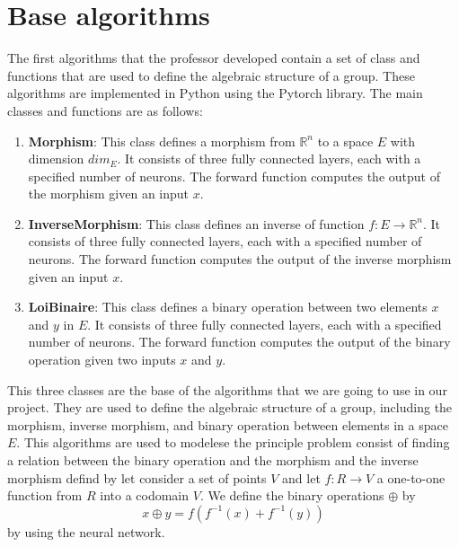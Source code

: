 \documentclass{report}
\begin{document}
        \section{Base algorithms}
        The first algorithms that the professor developed contain 
        a set of class and functions that are used to define the
        algebraic structure of a group. These algorithms are
        implemented in Python using the Pytorch library. The
        main classes and functions are as follows:

        \begin{enumerate}
            \item \textbf{Morphism}: This class defines a morphism from 
            $\mathbb{R}^n$ to a space $E$ with dimension $dim_E$. 
            It consists of three fully connected layers, each with 
            a specified number of neurons. The forward function computes 
            the output of the morphism given an input $x$.
            \item \textbf{InverseMorphism}: This class defines an inverse
            of function $f: E \rightarrow \mathbb{R}^n$. It consists of
            three fully connected layers, each with a specified number
            of neurons. The forward function computes the output of the
            inverse morphism given an input $x$.
            \item \textbf{LoiBinaire}: This class defines a binary operation 
            between two elements $x$ and $y$ in $E$. It consists of three 
            fully connected layers, each with a specified number of neurons. 
            The forward function computes the output of the binary operation 
            given two inputs $x$ and $y$.

        \end{enumerate}
        This three classes are the base of the algorithms that 
        we are going to use in our project. They are used to 
        define the algebraic structure of a group, including
        the morphism, inverse morphism, and binary operation
        between elements in a space $E$. This algorithms are used to 
        modelese the principle problem consist of finding a relation 
        between the binary operation and the morphism and the inverse
        morphism  defind by let consider a set of points  $ V $ and let 
        $ f: R \rightarrow V $ a one-to-one function from $R$ into a 
        codomain $V$. We define the binary operations $\oplus$ by
        $$ 
        x \oplus y = f(f^{-1}(x) + f^{-1}(y)) 
        $$ 
         by using the neural network.\\
\end{document}
